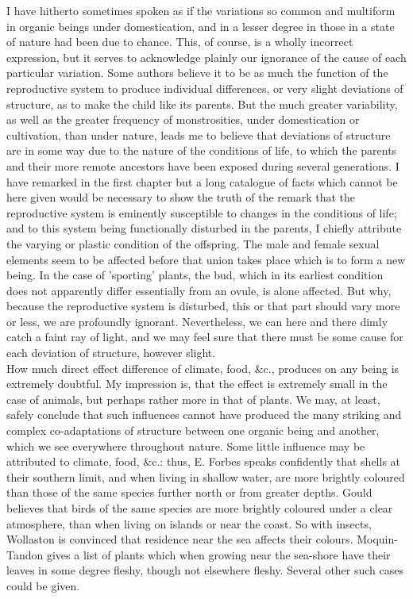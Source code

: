 \indent I have hitherto sometimes spoken as if the variations so common and multiform in organic beings under domestication, and in a lesser degree in those in a state of nature had been due to chance. This, of course, is a wholly incorrect expression, but it serves to acknowledge plainly our ignorance of the cause of each particular variation. Some authors believe it to be as much the function of the reproductive system to produce individual differences, or very slight deviations of structure, as to make the child like its parents. But the much greater variability, as well as the greater frequency of monstrosities, under domestication or cultivation, than under nature, leads me to believe that deviations of structure are in some way due to the nature of the conditions of life, to which the parents and their more remote ancestors have been exposed during several generations. I have remarked in the first chapter but a long catalogue of facts which cannot be here given would be necessary to show the truth of the remark that the reproductive system is eminently susceptible to changes in the conditions of life; and to this system being functionally disturbed in the parents, I chiefly attribute the varying or plastic condition of the offspring. The male and female sexual elements seem to be affected before that union takes place which is to form a new being. In the case of 'sporting' plants, the bud, which in its earliest condition does not apparently differ essentially from an ovule, is alone affected. But why, because the reproductive system is disturbed, this or that part should vary more or less, we are profoundly ignorant. Nevertheless, we can here and there dimly catch a faint ray of light, and we may feel sure that there must be some cause for each deviation of structure, however slight.\\
\indent How much direct effect difference of climate, food, \&c., produces on any being is extremely doubtful. My impression is, that the effect is extremely small in the case of animals, but perhaps rather more in that of plants. We may, at least, safely conclude that such influences cannot have produced the many striking and complex co-adaptations of structure between one organic being and another, which we see everywhere throughout nature. Some little influence may be attributed to climate, food, \&c.: thus, E. Forbes speaks confidently that shells at their southern limit, and when living in shallow water, are more brightly coloured than those of the same species further north or from greater depths. Gould believes that birds of the same species are more brightly coloured under a clear atmosphere, than when living on islands or near the coast. So with insects, Wollaston is convinced that residence near the sea affects their colours. Moquin-Tandon gives a list of plants which when growing near the sea-shore have their leaves in some degree fleshy, though not elsewhere fleshy. Several other such cases could be given.\\
